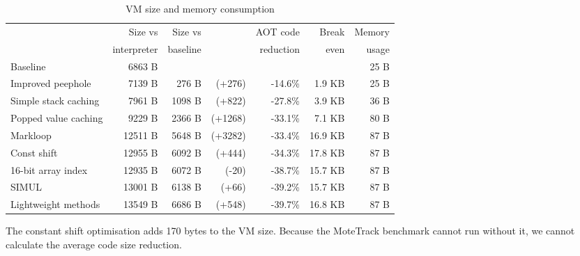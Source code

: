 \begin{table}
\centering
\caption{VM size and memory consumption}
\label{tbl-code-size-and-memory-consumption}
    \begin{threeparttable}
    \begin{tabular}{lrrrrrr} %
    \toprule
                              & Size vs     & Size vs  &                      & AOT code  &   Break & Memory    \\
                              & interpreter & baseline &                      & reduction &   even  & usage     \\
    \midrule
    \midrule
    Baseline                  &     6863 B  &          &                      &           &         & 25 B      \\
    Improved peephole         &     7139 B  &   276 B  & \scriptsize   (+276) &  -14.6\%  &  1.9 KB & 25 B      \\
    Simple stack caching      &     7961 B  &  1098 B  & \scriptsize   (+822) &  -27.8\%  &  3.9 KB & 36 B      \\
    Popped value caching      &     9229 B  &  2366 B  & \scriptsize  (+1268) &  -33.1\%  &  7.1 KB & 80 B      \\
    Markloop                  &    12511 B  &  5648 B  & \scriptsize  (+3282) &  -33.4\%  & 16.9 KB & 87 B      \\
    Const shift               &    12955 B  &  6092 B  & \scriptsize   (+444) &  -34.3\%  & 17.8 KB & 87 B      \\
    16-bit array index        &    12935 B  &  6072 B  & \scriptsize    (-20) &  -38.7\%  & 15.7 KB & 87 B      \\
    SIMUL                     &    13001 B  &  6138 B  & \scriptsize    (+66) &  -39.2\%  & 15.7 KB & 87 B      \\
    Lightweight methods       &    13549 B  &  6686 B  & \scriptsize   (+548) &  -39.7\%  & 16.8 KB & 87 B      \\
    \bottomrule
    \end{tabular}
    \begin{tablenotes}
        \item The constant shift optimisation adds 170 bytes to the VM size. Because the MoteTrack benchmark cannot run without it, we cannot calculate the average code size reduction.
    \end{tablenotes}
    \end{threeparttable}
\end{table}
